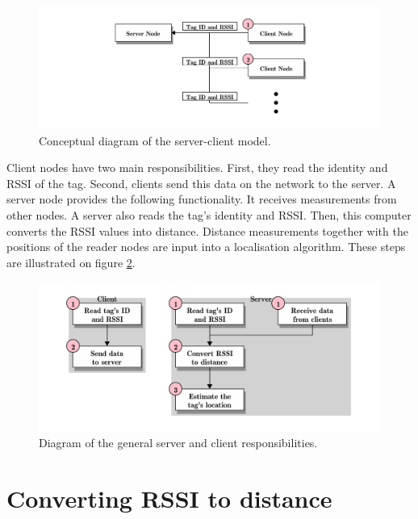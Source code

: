 \begin{figure}[h]
	\begin{center}
		\includegraphics[width=1\textwidth]{figures/blockdiag/serverclient}
		\caption{Conceptual diagram of the server-client model.}
		\label{fig:sercli}
	\end{center}
\end{figure}

Client nodes have two main responsibilities. First, they read the identity and RSSI of the tag. Second, clients send this data on the network to the server. A server node provides the following functionality. It receives measurements from other nodes. A server also reads the tag's identity and RSSI. Then, this computer converts the RSSI values into distance. Distance measurements together with the positions of the reader nodes are input into a localisation algorithm. These steps are illustrated on figure \ref{fig:sercliresp}.

\begin{figure}[h]
	\begin{center}
		\includegraphics[width=1\textwidth]{figures/blockdiag/serverclientresp}
		\caption{Diagram of the general server and client responsibilities.}
		\label{fig:sercliresp}
	\end{center}
\end{figure}

\section{Converting RSSI to distance}
\label{sec:rssitodist}

